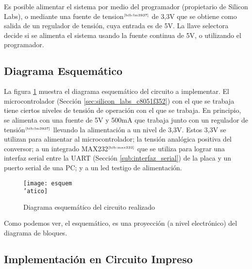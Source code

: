 Es posible alimentar el sistema por medio del programador (propietario de Silicon Labs), o mediante una fuente de tension$^{\tiny{\cite{bib:lm2937}}}$ de 3,3V que se obtiene como salida de un regulador de tensi\'on, cuya entrada es de 5V. La llave selectora decide si se alimenta el sistema usando la fuente continua de 5V, o utilizando el programador.




\subsection{Diagrama Esquem\'atico} %
\label{sub:diagrama_esquematico}

La figura \ref{fig:esquematico} muestra el diagrama esquem\'atico del circuito a implementar. El microcontrolador (Secci\'on \ref{sec:silicon_labs_c8051f352}) con el que se trabaja tiene ciertos niveles de tensi\'on de operaci\'on con el que se trabaja. En principio, se alimenta con una fuente de 5V y 500mA que trabaja junto con un regulador de tensi\'on$^{\tiny{\cite{bib:lm2937}}}$ llevando la alimentaci\'on a un nivel de 3,3V. Estos 3,3V se utilizan para alimentar al microcontrolador; la tensi\'on anal\'ogica positiva del conversor; a un integrado MAX232$^{\tiny{\cite{bib:max232}}}$ que se utiliza para lograr una interfaz serial entre la UART (Secci\'on \ref{sub:interfaz_serial}) de la placa y un puerto serial de una PC; y a un led testigo de alimentaci\'on.


\begin{figure}[h]
  \centering
  \texttt{[image: esquem\\'atico]}
  \caption{\small Diagrama esquem\'atico del circuito realizado}\label{fig:esquematico}
\end{figure}

Como podemos ver, el esquem\'atico, es una proyecci\'on (a nivel electr\'onico) del diagrama de bloques. %


\subsection{Implementaci\'on en Circuito Impreso} %
\label{sub:implementacion_en_circuito_impreso}

